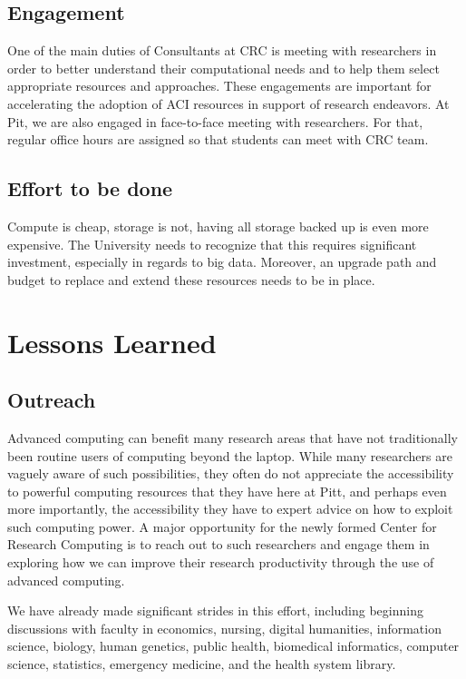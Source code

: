 \documentclass[conference]{IEEEtran}
\begin{document}
\subsection{Engagement}
One of the main duties of Consultants at CRC is meeting with	researchers	in order to better	understand their computational needs and to help them select appropriate resources and approaches. These engagements are important for accelerating the adoption of ACI resources in support of research endeavors. At Pit, we are also engaged in face-to-face meeting with researchers. For that, regular office hours are assigned so that students can meet with CRC team.

\subsection{Effort to be done}
Compute is
cheap, storage is not, having all storage backed up is even more expensive. The University needs
to recognize that this requires significant investment, especially in regards to big data. Moreover,
an upgrade path and budget to replace and extend these resources needs to be in place.


\section{Lessons Learned}

\subsection*{Outreach}
Advanced computing can benefit many research areas that have not traditionally been routine users of computing beyond the laptop.  While many researchers are vaguely aware of such possibilities, they often do not appreciate the accessibility to powerful computing resources that they have here at Pitt, and perhaps even more importantly, the accessibility they have to expert advice on how to exploit such computing power. A major opportunity for the newly formed Center for Research Computing is to reach out to such researchers and engage them in exploring how we can improve their research productivity through the use of advanced computing.

We have already made significant strides in this effort, including beginning discussions with faculty in economics, nursing, digital humanities, information science, biology, human genetics, public health, biomedical informatics, computer science, statistics, emergency medicine, and the health system library.
\end{document}
